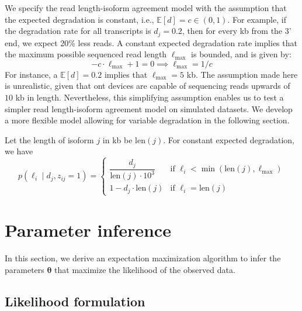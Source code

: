 We specify the read length-isoform agreement model with the assumption that the expected degradation is constant, i.e., $\mathbb{E}[d]=c\in(0,1)$. For example, if the degradation rate for all transcripts is $d_j=0.2$, then for every kb from the 3' end, we expect 20\% less reads. A constant expected degradation rate  implies that the maximum possible sequenced read length $\ell_\mathrm{max}$ is bounded, and is given by:
\begin{equation}
    -c\cdot \ell_\mathrm{max} + 1 = 0 \implies \ell_\mathrm{max} = 1/c
\end{equation}
For instance, a $\mathbb{E}[d]=0.2$ implies that $\ell_\mathrm{max}=5$ kb. The assumption made here is unrealistic, given that \gls{ont} devices are capable of sequencing reads upwards of $10$ kb in length. Nevertheless, this simplifying assumption enables us to test a simpler read length-isoform agreement model on simulated datasets. We develop a more flexible model allowing for variable degradation in the following section.  

Let the length of isoform $j$  in kb be len$(j)$. For constant expected degradation, we have
\begin{equation}
    p(\ell_i\mid d_j, z_{ij}=1) = 
    \begin{cases}
        \dfrac{d_j}{\mathrm{len}(j)\cdot10^3} & \textrm{if } \ell_i<\min(\mathrm{len}(j), \ell_\mathrm{max})\\
        1-d_j\cdot\mathrm{len}(j) & \textrm{if } \ell_i=\mathrm{len}(j)
    \end{cases}
\end{equation}

\section{Parameter inference}

In this section, we derive an expectation maximization algorithm to infer the parameters $\bm{\theta}$ that maximize the likelihood of the observed data.

\subsection{Likelihood formulation}\label{sec:likelihood-formulation}

